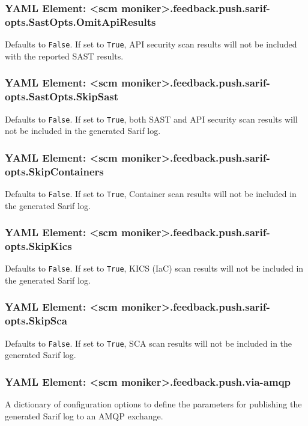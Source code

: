 \subsubsection{YAML Element: <scm moniker>.feedback.push.sarif-opts.SastOpts.OmitApiResults}\label{sec:yaml-push-sarif-opts-sastopts-omitapiresults}
Defaults to \texttt{False}.  If set to \texttt{True}, API security scan results will not be included with the reported SAST results.

\subsubsection{YAML Element: <scm moniker>.feedback.push.sarif-opts.SastOpts.SkipSast}\label{sec:yaml-push-sarif-opts-sastopts-skipsast}
Defaults to \texttt{False}.  If set to \texttt{True}, both SAST and API security scan results will not be included in the generated Sarif log.

\subsubsection{YAML Element: <scm moniker>.feedback.push.sarif-opts.SkipContainers}\label{sec:yaml-push-sarif-opts-skipcontainers}
Defaults to \texttt{False}.  If set to \texttt{True}, Container scan results will not be included in the generated Sarif log.
\subsubsection{YAML Element: <scm moniker>.feedback.push.sarif-opts.SkipKics}\label{sec:yaml-push-sarif-opts-skipkics}
Defaults to \texttt{False}.  If set to \texttt{True}, KICS (IaC) scan results will not be included in the generated Sarif log.
\subsubsection{YAML Element: <scm moniker>.feedback.push.sarif-opts.SkipSca}\label{sec:yaml-push-sarif-opts-skipsca}
Defaults to \texttt{False}.  If set to \texttt{True}, SCA scan results will not be included in the generated Sarif log.

\subsubsection{YAML Element: <scm moniker>.feedback.push.via-amqp}\label{sec:yaml-push-via-amqp}
A dictionary of configuration options to define the parameters for publishing the generated Sarif log to an AMQP exchange.

